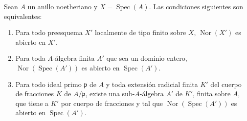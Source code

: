 \begin{proposition}[6.13.7]
\label{IV.2.s6.13.7-fr}
Sean $A$ un anillo noetheriano y $X=\operatorname{Spec}(A)$. Las
condiciones siguientes son equivalentes:
\begin{enumerate}
\item[\textup{a)}] Para todo preesquema $X'$ localmente de tipo finito sobre $X$,
$\operatorname{Nor}(X')$ es abierto en $X'$.
\item[\textup{b)}] Para toda $A$-álgebra finita $A'$ que sea un dominio entero,
$\operatorname{Nor}(\operatorname{Spec}(A'))$ es abierto en
$\operatorname{Spec}(A')$.
\item[\textup{c)}] Para todo ideal primo $\mathfrak p$ de $A$ y toda extensión
radicial finita $K'$ del cuerpo de fracciones $K$ de $A/\mathfrak p$,
existe una sub-$A$-álgebra $A'$ de $K'$, finita sobre $A$, que tiene a
$K'$ por cuerpo de fracciones y tal que
$\operatorname{Nor}(\operatorname{Spec}(A'))$ es abierto en
$\operatorname{Spec}(A')$.
\end{enumerate}
\end{proposition}

